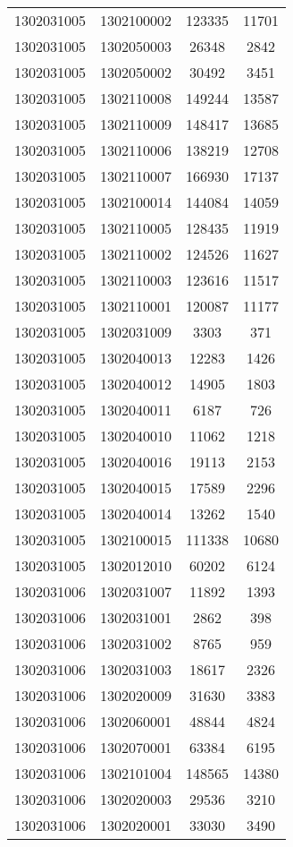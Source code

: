 \begin{longtable}[h]{llcc}
		1302031005 & 1302100002 & 123335 & 11701\\
		1302031005 & 1302050003 & 26348 & 2842\\
		1302031005 & 1302050002 & 30492 & 3451\\
		1302031005 & 1302110008 & 149244 & 13587\\
		1302031005 & 1302110009 & 148417 & 13685\\
		1302031005 & 1302110006 & 138219 & 12708\\
		1302031005 & 1302110007 & 166930 & 17137\\
		1302031005 & 1302100014 & 144084 & 14059\\
		1302031005 & 1302110005 & 128435 & 11919\\
		1302031005 & 1302110002 & 124526 & 11627\\
		1302031005 & 1302110003 & 123616 & 11517\\
		1302031005 & 1302110001 & 120087 & 11177\\
		1302031005 & 1302031009 & 3303 & 371\\
		1302031005 & 1302040013 & 12283 & 1426\\
		1302031005 & 1302040012 & 14905 & 1803\\
		1302031005 & 1302040011 & 6187 & 726\\
		1302031005 & 1302040010 & 11062 & 1218\\
		1302031005 & 1302040016 & 19113 & 2153\\
		1302031005 & 1302040015 & 17589 & 2296\\
		1302031005 & 1302040014 & 13262 & 1540\\
		1302031005 & 1302100015 & 111338 & 10680\\
		1302031005 & 1302012010 & 60202 & 6124\\
		1302031006 & 1302031007 & 11892 & 1393\\
		1302031006 & 1302031001 & 2862 & 398\\
		1302031006 & 1302031002 & 8765 & 959\\
		1302031006 & 1302031003 & 18617 & 2326\\
		1302031006 & 1302020009 & 31630 & 3383\\
		1302031006 & 1302060001 & 48844 & 4824\\
		1302031006 & 1302070001 & 63384 & 6195\\
		1302031006 & 1302101004 & 148565 & 14380\\
		1302031006 & 1302020003 & 29536 & 3210\\
		1302031006 & 1302020001 & 33030 & 3490\\

\end{longtable}
